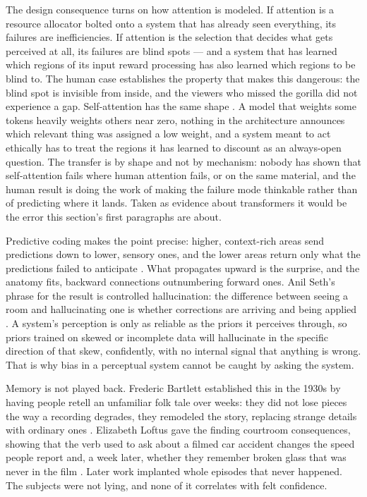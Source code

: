The design consequence turns on how attention is modeled. If attention is a resource allocator bolted onto a system that has already seen everything, its failures are inefficiencies. If attention is the selection that decides what gets perceived at all, its failures are blind spots — and a system that has learned which regions of its input reward processing has also learned which regions to be blind to. The human case establishes the property that makes this dangerous: the blind spot is invisible from inside, and the viewers who missed the gorilla did not experience a gap. Self-attention has the same shape \autocite{vaswani2017attention}. A model that weights some tokens heavily weights others near zero, nothing in the architecture announces which relevant thing was assigned a low weight, and a system meant to act ethically has to treat the regions it has learned to discount as an always-open question. The transfer is by shape and not by mechanism: nobody has shown that self-attention fails where human attention fails, or on the same material, and the human result is doing the work of making the failure mode thinkable rather than of predicting where it lands. Taken as evidence about transformers it would be the error this section's first paragraphs are about.

Predictive coding makes the point precise: higher, context-rich areas send predictions down to lower, sensory ones, and the lower areas return only what the predictions failed to anticipate \autocite{rao1999predictive}. What propagates upward is the surprise, and the anatomy fits, backward connections outnumbering forward ones. Anil Seth's phrase for the result is controlled hallucination: the difference between seeing a room and hallucinating one is whether corrections are arriving and being applied \autocite{seth2021being}. A system's perception is only as reliable as the priors it perceives through, so priors trained on skewed or incomplete data will hallucinate in the specific direction of that skew, confidently, with no internal signal that anything is wrong. That is why bias in a perceptual system cannot be caught by asking the system.

Memory is not played back. Frederic Bartlett established this in the 1930s by having people retell an unfamiliar folk tale over weeks: they did not lose pieces the way a recording degrades, they remodeled the story, replacing strange details with ordinary ones \autocite{bartlett1932remembering}. Elizabeth Loftus gave the finding courtroom consequences, showing that the verb used to ask about a filmed car accident changes the speed people report and, a week later, whether they remember broken glass that was never in the film \autocite{loftus1974reconstruction}. Later work implanted whole episodes that never happened. The subjects were not lying, and none of it correlates with felt confidence.

